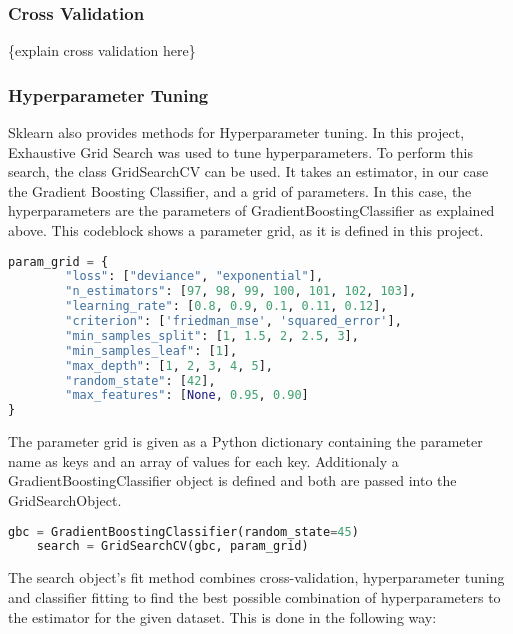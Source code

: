 \subsubsection{Cross Validation}
\{explain cross validation here\}

\subsubsection{Hyperparameter Tuning}

Sklearn also provides methods for Hyperparameter tuning. In this project, Exhaustive Grid Search was used to 
tune hyperparameters. To perform this search, the class GridSearchCV can be used. It takes an 
estimator, in our case the Gradient Boosting Classifier, and a grid of parameters.
In this case, the hyperparameters are the parameters of GradientBoostingClassifier as 
explained above. This codeblock shows a parameter grid, as it is defined in this project.

\begin{lstlisting}[language=Python]
    param_grid = {
        "loss": ["deviance", "exponential"],
        "n_estimators": [97, 98, 99, 100, 101, 102, 103],
        "learning_rate": [0.8, 0.9, 0.1, 0.11, 0.12],
        "criterion": ['friedman_mse', 'squared_error'],
        "min_samples_split": [1, 1.5, 2, 2.5, 3],
        "min_samples_leaf": [1],
        "max_depth": [1, 2, 3, 4, 5],
        "random_state": [42],
        "max_features": [None, 0.95, 0.90]
}
\end{lstlisting}

The parameter grid is given as a Python dictionary containing the parameter name as keys and 
an array of values for each key. Additionaly a GradientBoostingClassifier object is defined 
and both are passed into the GridSearchObject.

\begin{lstlisting}[language=Python]
    gbc = GradientBoostingClassifier(random_state=45)    
    search = GridSearchCV(gbc, param_grid)
\end{lstlisting}

The search object's fit method combines cross-validation, hyperparameter tuning and classifier
fitting to find the best possible combination of hyperparameters to the estimator for the given dataset.
This is done in the following way:

